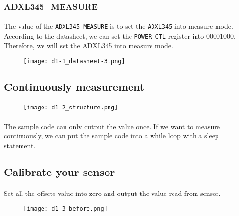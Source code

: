 \subsubsection{ADXL345\_MEASURE}
\paragraph{}
The value of the \texttt{ADXL345\_MEASURE} is to set the \texttt{ADXL345} into measure mode. According to the datasheet, we can set the \texttt{POWER\_CTL} register into {00001000}. Therefore, we will set the ADXL345 into measure mode.
\begin{figure}[!h]
    \begin{center} 
        \texttt{[image: d1-1\_datasheet-3.png]} 
    \end{center} 
\end{figure} 
\subsection{Continuously measurement}
\paragraph{}
\begin{figure}[!h]
    \begin{center} 
        \texttt{[image: d1-2\_structure.png]} 
    \end{center} 
\end{figure} 
\paragraph{}
The sample code can only output the value once. If we want to measure continuously, we can put the sample code into a while loop with a sleep statement.
\subsection{Calibrate your sensor}
\paragraph{}
Set all the offsets value into zero and output the value read from sensor.
\begin{figure}[!h]
    \begin{center} 
        \texttt{[image: d1-3\_before.png]} 
    \end{center} 
\end{figure} 
